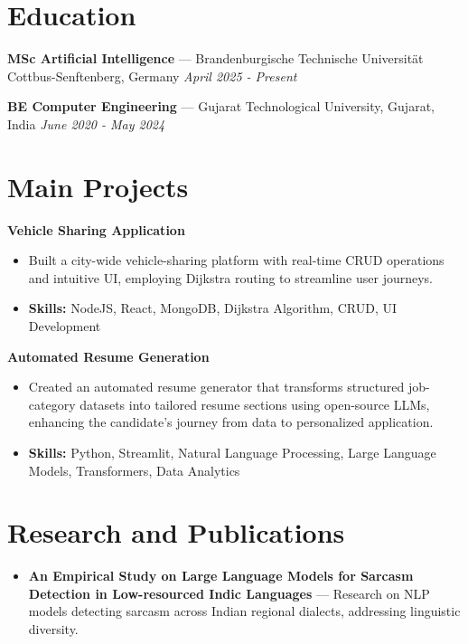 \documentclass[a4paper,10pt]{article}
\begin{document}
\section*{Education}
\textbf{MSc Artificial Intelligence} — Brandenburgische Technische Universität Cottbus-Senftenberg, Germany \hfill \textit{April 2025 - Present}\par
\vspace{1.5pt}
\textbf{BE Computer Engineering} — Gujarat Technological University, Gujarat, India \hfill \textit{June 2020 - May 2024}\par

\section*{Main Projects}
\textbf{Vehicle Sharing Application}\par
\vspace{1pt}
\begin{itemize}
  \item Built a city-wide vehicle-sharing platform with real-time CRUD operations and intuitive UI, employing Dijkstra routing to streamline user journeys.
  \item \textbf{Skills:} NodeJS, React, MongoDB, Dijkstra Algorithm, CRUD, UI Development
\end{itemize}
\vspace{3pt}
\textbf{Automated Resume Generation}\par
\vspace{1pt}
\begin{itemize}
  \item Created an automated resume generator that transforms structured job-category datasets into tailored resume sections using open-source LLMs, enhancing the candidate's journey from data to personalized application.
  \item \textbf{Skills:} Python, Streamlit, Natural Language Processing, Large Language Models, Transformers, Data Analytics
\end{itemize}

\section*{Research and Publications}
\begin{itemize}
\item \textbf{An Empirical Study on Large Language Models for Sarcasm Detection in Low-resourced Indic Languages} — Research on NLP models detecting sarcasm across Indian regional dialects, addressing linguistic diversity.
\end{itemize}
\end{document}
